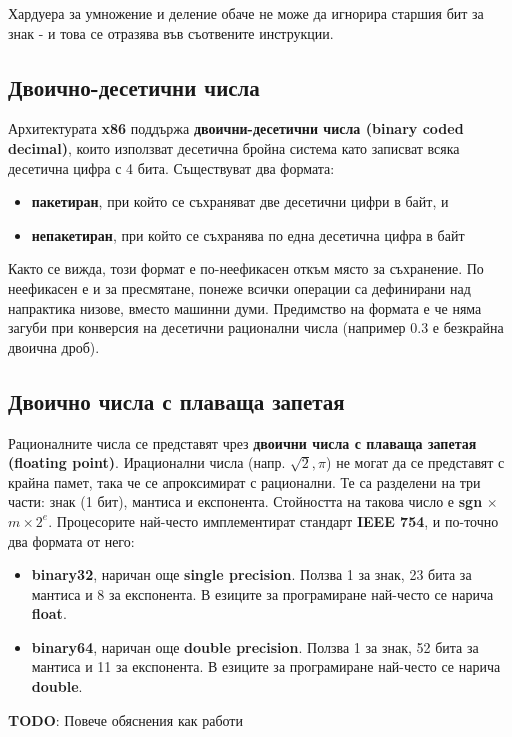 \documentclass[fleqn,12pt]{article}
\begin{document}
Хардуера за умножение и деление обаче не може да игнорира старшия бит за знак - и това се отразява във съотвените инструкции.

\subsection{Двоично-десетични числа}
Архитектурата \textbf{x86} поддържа \textbf{двоични-десетични числа (binary coded decimal)}, които използват десетична бройна система като
записват всяка десетична цифра с 4 бита. Съществуват два формата:
\begin{itemize}
    \item \textbf{пакетиран}, при който се съхраняват две десетични цифри в байт, и
    \item \textbf{непакетиран}, при който се съхранява по една десетична цифра в байт
\end{itemize}
Както се вижда, този формат е по-неефикасен откъм място за съхранение. По неефикасен е и за пресмятане, понеже всички операции са 
дефинирани над напрактика низове, вместо машинни думи. Предимство на формата е че няма загуби при конверсия на десетични рационални числа
(например $0.3$ е безкрайна двоична дроб).

\subsection{Двоично числа с плаваща запетая}
Рационалните числа се представят чрез \textbf{двоични числа с плаваща запетая (floating point)}.
Ирационални числа (напр. $\sqrt{2}, \pi$) не могат да се представят с крайна памет, така че се апроксимират с рационални.
Те са разделени на три части: знак (1 бит), мантиса и експонента. Стойността на такова число е \textbf{sgn} $ \times $ $ m \times 2^e$.
Процесорите най-често имплементират стандарт \textbf{IEEE 754}, и по-точно два формата от него:
\begin{itemize}
    \item \textbf{binary32}, наричан още \textbf{single precision}. Ползва 1 за знак, 23 бита за мантиса и 8 за експонента. В езиците за програмиране най-често се нарича \textbf{float}.
    \item \textbf{binary64}, наричан още \textbf{double precision}. Ползва 1 за знак, 52 бита за мантиса и 11 за експонента. В езиците за програмиране най-често се нарича \textbf{double}.
\end{itemize}

\textbf{TODO}: Повече обяснения как работи
\end{document}
